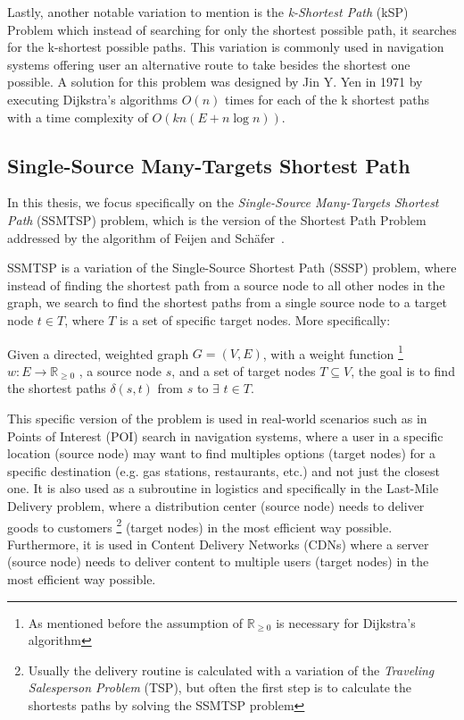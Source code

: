 Lastly, another notable variation to mention is the \textit{k-Shortest Path} (kSP) Problem which instead of searching for only the shortest possible path, it searches for the k-shortest possible paths. 
This variation is commonly used in navigation systems offering user an alternative route to take besides the shortest one possible. 
A solution for this problem was designed by Jin Y. Yen\cite{yenFindingShortestLoopless1971a} in 1971 by executing Dijkstra's algorithms $O(n)$ times for each of the k shortest paths with a time complexity of $O(kn(E+n\log n))$.

\subsection{Single-Source Many-Targets Shortest Path}
In this thesis, we focus specifically on the \textit{Single-Source Many-Targets Shortest Path} (SSMTSP) problem, which is the version of the Shortest Path Problem addressed by the algorithm of Feijen and Schäfer~\cite{feijenDijkstrasAlgorithmPredictions2023}.

SSMTSP is a variation of the Single-Source Shortest Path (SSSP) problem, where instead of finding the shortest path from a source node to all other nodes in the graph, we search to find the shortest paths from a single source node to a target node $t \in T$, where $T$ is a set of specific target nodes.
More specifically:

Given a directed, weighted graph $G=(V, E)$, with a weight function 
\footnote{As mentioned before the assumption of $\mathbb{R}_{\geq 0}$ is necessary for Dijkstra's algorithm}
$w: E \rightarrow \mathbb{R}_{\geq 0}$
, a source node $s$, and a set of target nodes $T \subseteq V$, the goal is to find the shortest paths $\delta(s,t)$ from $s$ to $\exists$ $t \in T$.

This specific version of the problem is used in real-world scenarios such as in Points of Interest (POI) search in navigation systems, where a user in a specific location (source node) may want to find multiples options (target nodes) for a specific destination (e.g. gas stations, restaurants, etc.) and not just the closest one.
It is also used as a subroutine in logistics and specifically in the Last-Mile Delivery problem, where a distribution center (source node) needs to deliver goods to customers
\footnote{Usually the delivery routine is calculated with a variation of the \textit{Traveling Salesperson Problem} (TSP), but often the first step is to calculate the shortests paths by solving the SSMTSP problem}
(target nodes) in the most efficient way possible.
Furthermore, it is used in Content Delivery Networks (CDNs) where a server (source node) needs to deliver content to multiple users (target nodes) in the most efficient way possible. 

